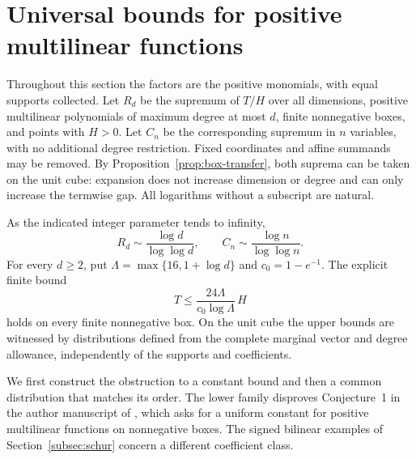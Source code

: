\section{Universal bounds for positive multilinear functions}
\label{sec:positive-universal}
Throughout this section the factors are the positive monomials, with equal
supports collected. Let $R_d$ be the supremum of $T/H$ over all dimensions,
positive multilinear polynomials of maximum degree at most $d$, finite
nonnegative boxes, and points with $H>0$. Let $C_n$ be the corresponding
supremum in $n$ variables, with no additional degree restriction. Fixed
coordinates and affine summands may be removed. By
Proposition~\ref{prop:box-transfer}, both suprema can be taken on the unit
cube: expansion does not increase dimension or degree and can only increase
the termwise gap.
All logarithms without a subscript are natural.

\begin{theorem}\label{thm:positive-growth}
As the indicated integer parameter tends to infinity,
\begin{equation}\label{eq:positive-growth}
 R_d\sim\frac{\log d}{\log\log d},\qquad
 C_n\sim\frac{\log n}{\log\log n}.
\end{equation}
For every $d\ge2$, put $\Lambda=\max\{16,1+\log d\}$ and $c_0=1-e^{-1}$.
The explicit finite bound
\begin{equation}\label{eq:original-harmonic-finite}
 T\le\frac{24\Lambda}{c_0\log\Lambda}\,H
\end{equation}
holds on every finite nonnegative box. On the unit cube the upper bounds
are witnessed by distributions defined from the complete marginal vector
and degree allowance, independently of the supports and coefficients.
\end{theorem}

We first construct the obstruction to a constant bound and then a common
distribution that matches its order. The lower family disproves
Conjecture~1 in the author manuscript of \citet[p.~22]{Luedtke2012}, which
asks for a uniform constant for positive multilinear functions on
nonnegative boxes. The signed bilinear examples of Section~\ref{subsec:schur} concern a
different coefficient class.

